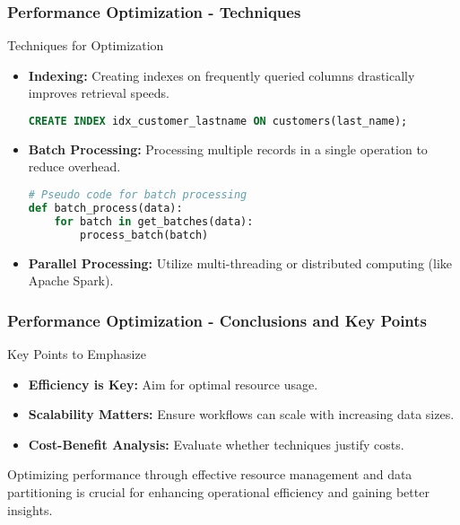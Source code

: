 \documentclass{beamer}
\begin{document}
\begin{frame}[fragile]
    \frametitle{Performance Optimization - Techniques}
    \begin{block}{Techniques for Optimization}
        \begin{itemize}
            \item \textbf{Indexing:} Creating indexes on frequently queried columns drastically improves retrieval speeds.
            
            \begin{lstlisting}[language=SQL]
CREATE INDEX idx_customer_lastname ON customers(last_name);
            \end{lstlisting}

            \item \textbf{Batch Processing:} Processing multiple records in a single operation to reduce overhead.
            
            \begin{lstlisting}[language=Python]
# Pseudo code for batch processing
def batch_process(data):
    for batch in get_batches(data):
        process_batch(batch)
            \end{lstlisting}

            \item \textbf{Parallel Processing:} Utilize multi-threading or distributed computing (like Apache Spark).
        \end{itemize}
    \end{block}
\end{frame}

\begin{frame}[fragile]
    \frametitle{Performance Optimization - Conclusions and Key Points}
    \begin{block}{Key Points to Emphasize}
        \begin{itemize}
            \item \textbf{Efficiency is Key:} Aim for optimal resource usage.
            \item \textbf{Scalability Matters:} Ensure workflows can scale with increasing data sizes.
            \item \textbf{Cost-Benefit Analysis:} Evaluate whether techniques justify costs.
        \end{itemize}
    \end{block}
    
    \smallskip
    Optimizing performance through effective resource management and data partitioning is crucial for enhancing operational efficiency and gaining better insights.
\end{frame}
\end{document}
